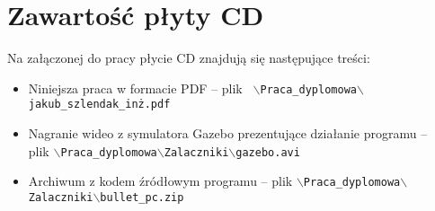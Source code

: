 \appendix
\chapter{Zawartość płyty CD}

Na załączonej do pracy płycie CD znajdują się następujące treści:
\begin{itemize}
 \item Niniejsza praca w formacie PDF -- plik \texttt{ $\backslash$Praca{\_}dyplomowa$\backslash$jakub{\_}szlendak{\_}inż.pdf}
 \item Nagranie wideo z symulatora Gazebo prezentujące działanie programu -- \\ plik \texttt{$\backslash$Praca{\_}dyplomowa$\backslash$Zalaczniki$\backslash$gazebo.avi}
 \item Archiwum z kodem źródłowym programu -- plik \texttt{$\backslash$Praca{\_}dyplomowa$\backslash$Zalaczniki$\backslash$bullet{\_}pc.zip}
\end{itemize}


